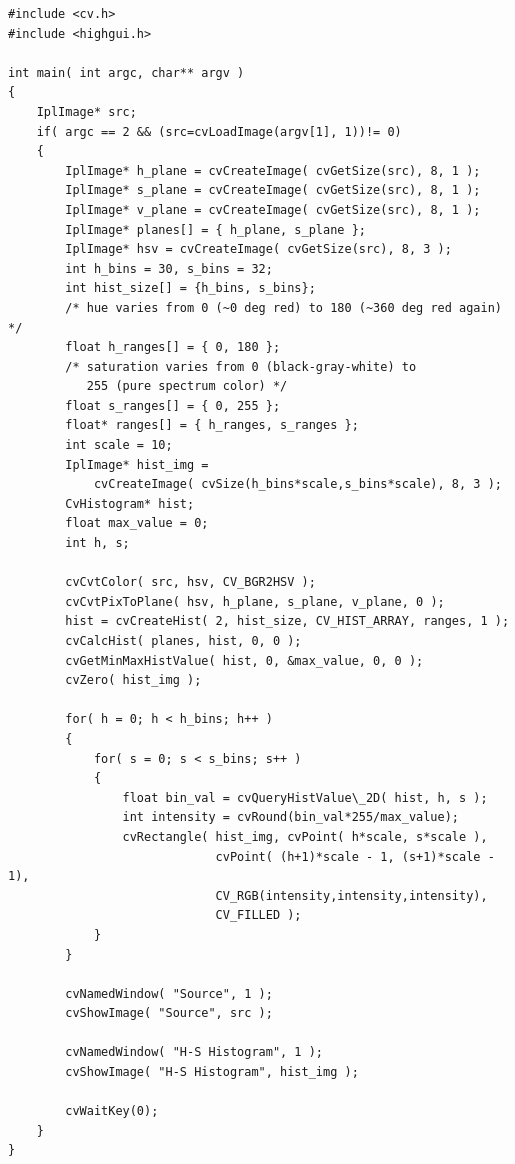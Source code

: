 \ifC %
\begin{lstlisting}
#include <cv.h>
#include <highgui.h>

int main( int argc, char** argv )
{
    IplImage* src;
    if( argc == 2 && (src=cvLoadImage(argv[1], 1))!= 0)
    {
        IplImage* h_plane = cvCreateImage( cvGetSize(src), 8, 1 );
        IplImage* s_plane = cvCreateImage( cvGetSize(src), 8, 1 );
        IplImage* v_plane = cvCreateImage( cvGetSize(src), 8, 1 );
        IplImage* planes[] = { h_plane, s_plane };
        IplImage* hsv = cvCreateImage( cvGetSize(src), 8, 3 );
        int h_bins = 30, s_bins = 32;
        int hist_size[] = {h_bins, s_bins};
        /* hue varies from 0 (~0 deg red) to 180 (~360 deg red again) */
        float h_ranges[] = { 0, 180 };
        /* saturation varies from 0 (black-gray-white) to
           255 (pure spectrum color) */
        float s_ranges[] = { 0, 255 };
        float* ranges[] = { h_ranges, s_ranges };
        int scale = 10;
        IplImage* hist_img =
            cvCreateImage( cvSize(h_bins*scale,s_bins*scale), 8, 3 );
        CvHistogram* hist;
        float max_value = 0;
        int h, s;

        cvCvtColor( src, hsv, CV_BGR2HSV );
        cvCvtPixToPlane( hsv, h_plane, s_plane, v_plane, 0 );
        hist = cvCreateHist( 2, hist_size, CV_HIST_ARRAY, ranges, 1 );
        cvCalcHist( planes, hist, 0, 0 );
        cvGetMinMaxHistValue( hist, 0, &max_value, 0, 0 );
        cvZero( hist_img );

        for( h = 0; h < h_bins; h++ )
        {
            for( s = 0; s < s_bins; s++ )
            {
                float bin_val = cvQueryHistValue\_2D( hist, h, s );
                int intensity = cvRound(bin_val*255/max_value);
                cvRectangle( hist_img, cvPoint( h*scale, s*scale ),
                             cvPoint( (h+1)*scale - 1, (s+1)*scale - 1),
                             CV_RGB(intensity,intensity,intensity),
                             CV_FILLED );
            }
        }

        cvNamedWindow( "Source", 1 );
        cvShowImage( "Source", src );

        cvNamedWindow( "H-S Histogram", 1 );
        cvShowImage( "H-S Histogram", hist_img );

        cvWaitKey(0);
    }
}
\end{lstlisting}
\else %
% 
\fi %

